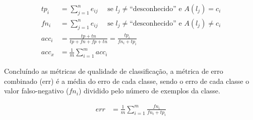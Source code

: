   \begin{align}
    tp_i            &= \sum_{j=1}^{n} e_{ij}        \quad \text{ se } l_j \neq \text{``desconhecido''} \text{ e } A(l_j) = c_i  \\
    fn_i            &= \sum_{j=1}^{n} e_{ij}        \quad \text{ se } l_j \neq \text{``desconhecido''} \text{ e } A(l_j) \neq c_i  \\
    \mathit{acc}_i  &= \frac{tp + tn}{tp+fn+fp+tn}  = \frac{tp_i}{fn_i + tp_i} \\
    \mathit{acc}_x & = \frac{1}{m} \sum_{i=1}^{m} \mathit{acc}_{i} \label{eq:acc}
  \end{align}

Concluíndo as métricas de qualidade de classificação, a métrica de erro
combinado (err) é a média do erro de cada classe, sendo o erro de cada classe
o valor falso-negativo ($fn_i$) dividido pelo número de exemplos da classe.

\begin{align}
\mathit{err} &= \frac{1}{m} \sum_{i=1}^{m} \frac{fn_i}{fn_i + tp_i}
\end{align}




